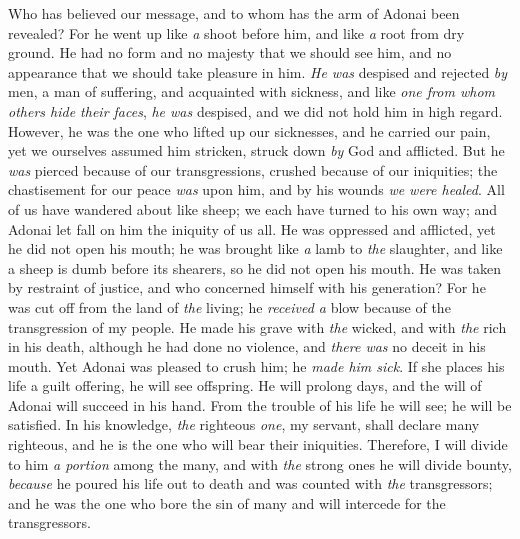 \begin{biblechapter} %
\verse Who has believed our message, 
and to whom has the arm of Adonai been revealed?
\verse For he went up like \textit{a} shoot before him, 
and like \textit{a} root from dry ground. 
He had no form and no majesty that we should see him, 
and no appearance that we should take pleasure in him.
\verse \textit{He was} despised and rejected \textit{by} men, 
a man of suffering, and acquainted with sickness, 
and like \textit{one from whom others hide their faces}, \textit{he was} despised, 
and we did not hold him in high regard.
\verse However, he was the one who lifted up our sicknesses, 
and he carried our pain, 
yet we ourselves assumed him stricken, 
struck down \textit{by} God and afflicted.
\verse But he \textit{was} pierced because of our transgressions, 
crushed because of our iniquities; 
the chastisement for our peace \textit{was} upon him, 
and by his wounds \textit{we were healed}.
\verse All of us have wandered about like sheep; 
we each have turned to his own way; 
and Adonai let fall on him 
the iniquity of us all.
\verse He was oppressed and afflicted, 
yet he did not open his mouth; 
he was brought like \textit{a} lamb to \textit{the} slaughter, 
and like a sheep is dumb before its shearers, 
so he did not open his mouth.
\verse He was taken by restraint of justice, 
and who concerned himself with his generation? 
For he was cut off from the land of \textit{the} living; 
he \textit{received a} blow because of the transgression of my people.
\verse He made his grave with \textit{the} wicked, 
and with \textit{the} rich in his death, 
although he had done no violence, 
and \textit{there was} no deceit in his mouth.
\verse Yet Adonai was pleased to crush him; 
he \textit{made him sick}. 
If she places his life a guilt offering, 
he will see offspring. 
He will prolong days, 
and the will of Adonai will succeed in his hand.
\verse From the trouble of his life he will see; 
he will be satisfied. 
In his knowledge, \textit{the} righteous \textit{one}, my servant, shall declare many righteous, 
and he is the one who will bear their iniquities.
\verse Therefore, I will divide to him \textit{a portion} among the many, 
and with \textit{the} strong ones he will divide bounty, 
\textit{because} he poured his life out to death 
and was counted with \textit{the} transgressors; 
and he was the one who bore the sin of many 
and will intercede for the transgressors.
\end{biblechapter}

